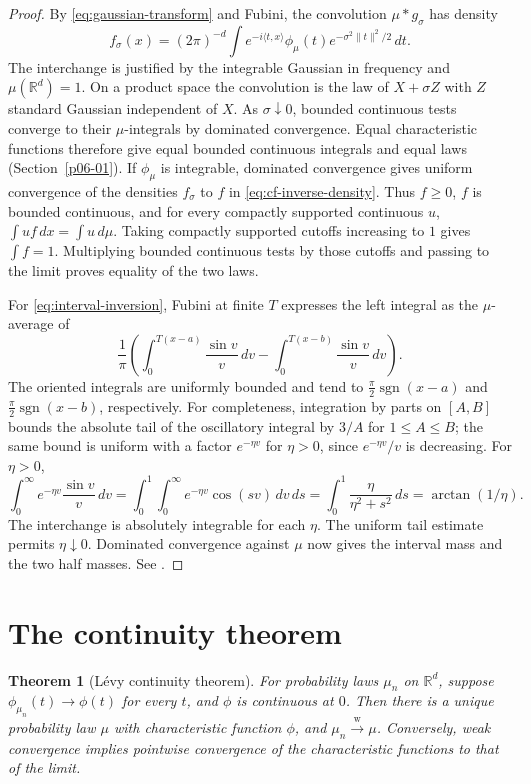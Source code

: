 \documentclass[11pt,oneside,openany]{book}
\newcommand{\R}{\mathbb{R}}
\newcommand{\weakto}{\xrightarrow{\mathrm{w}}}
\theoremstyle{plain}
\newtheorem{theorem}{Theorem}[chapter]
\theoremstyle{definition}
\theoremstyle{remark}
\begin{document}
\begin{proof}
By \eqref{eq:gaussian-transform} and Fubini, the convolution
\(\mu*g_\sigma\) has density
\[
 f_\sigma(x)=(2\pi)^{-d}\int
  e^{-i\langle t,x\rangle}\phi_\mu(t)e^{-\sigma^2\|t\|^2/2}\,dt .
\]
The interchange is justified by the integrable Gaussian in frequency
and \(\mu(\R^d)=1\). On a product space the convolution is the law of
\(X+\sigma Z\) with \(Z\) standard Gaussian independent of \(X\).
As \(\sigma\downarrow0\), bounded continuous tests converge to their
\(\mu\)-integrals by dominated convergence. Equal characteristic functions
therefore give equal bounded continuous integrals and equal laws
(Section~\ref{p06-01}). If \(\phi_\mu\) is integrable, dominated convergence
gives uniform convergence of the densities \(f_\sigma\) to \(f\) in
\eqref{eq:cf-inverse-density}. Thus \(f\ge0\), \(f\) is bounded continuous,
and for every compactly supported continuous \(u\),
\(\int uf\,dx=\int u\,d\mu\).
Taking compactly supported cutoffs increasing to \(1\) gives \(\int f=1\).
Multiplying bounded continuous tests by those cutoffs and passing to
the limit proves equality of the two laws.

For \eqref{eq:interval-inversion}, Fubini at finite \(T\) expresses the
left integral as the \(\mu\)-average of
\[
 \frac1\pi\left(
 \int_0^{T(x-a)}\frac{\sin v}{v}\,dv
 -
 \int_0^{T(x-b)}\frac{\sin v}{v}\,dv\right).
\]
The oriented integrals are uniformly bounded and tend to
\(\frac{\pi}{2}\operatorname{sgn}(x-a)\) and
\(\frac{\pi}{2}\operatorname{sgn}(x-b)\), respectively.
For completeness, integration by parts on \([A,B]\) bounds the absolute
tail of the oscillatory integral by \(3/A\) for \(1\le A\le B\);
the same bound is uniform with a factor \(e^{-\eta v}\) for \(\eta>0\),
since \(e^{-\eta v}/v\) is decreasing. For \(\eta>0\),
\[
 \int_0^\infty e^{-\eta v}\frac{\sin v}{v}\,dv
  =\int_0^1\int_0^\infty e^{-\eta v}\cos(sv)\,dv\,ds
  =\int_0^1\frac{\eta}{\eta^2+s^2}\,ds
  =\arctan(1/\eta).
\]
The interchange is absolutely integrable for each \(\eta\).
The uniform tail estimate permits \(\eta\downarrow0\).
Dominated convergence against \(\mu\) now gives the interval mass and
the two half masses. See \cite[Theorems 3.3.11 and 3.3.14]{Durrett}.
\end{proof}

\section{The continuity theorem}
\label{p07-03}

\begin{theorem}[L\'evy continuity theorem]\label{thm:levy-cont}
For probability laws \(\mu_n\) on \(\R^d\), suppose
\(\phi_{\mu_n}(t)\to \phi(t)\) for every \(t\), and \(\phi\) is
continuous at \(0\). Then there is a unique probability law \(\mu\)
with characteristic function \(\phi\), and \(\mu_n\weakto\mu\).
Conversely, weak convergence implies pointwise convergence of the
characteristic functions to that of the limit.
\end{theorem}
\end{document}
